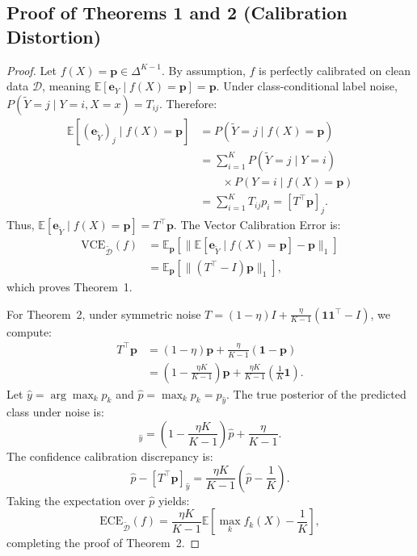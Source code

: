 \documentclass[journal]{IEEEtran}
\theoremstyle{definition}
\begin{document}
\subsection{Proof of Theorems 1 and 2 (Calibration Distortion)}
\label{sec:proof_calibration}
\begin{proof}
Let $f(X) = \mathbf{p} \in \Delta^{K-1}$. By assumption, $f$ is perfectly calibrated on clean data $\mathcal{D}$, meaning $\mathbb{E}[\mathbf{e}_Y \mid f(X) = \mathbf{p}] = \mathbf{p}$. Under class-conditional label noise, $P(\tilde{Y} = j \mid Y = i, X = x) = T_{ij}$. Therefore:
\begin{align}
\mathbb{E}[(\mathbf{e}_{\tilde{Y}})_j \mid f(X) = \mathbf{p}] &= P(\tilde{Y} = j \mid f(X) = \mathbf{p}) \nonumber \\
&= \sum_{i=1}^K P(\tilde{Y} = j \mid Y = i) \nonumber \\
&\qquad \times P(Y = i \mid f(X) = \mathbf{p}) \nonumber \\
&= \sum_{i=1}^K T_{ij} p_i = [T^\top \mathbf{p}]_j.
\end{align}
Thus, $\mathbb{E}[\mathbf{e}_{\tilde{Y}} \mid f(X) = \mathbf{p}] = T^\top \mathbf{p}$. The Vector Calibration Error is:
\begin{align}
\text{VCE}_{\tilde{\mathcal{D}}}(f) &= \mathbb{E}_{\mathbf{p}} \left[ \| \mathbb{E}[\mathbf{e}_{\tilde{Y}} \mid f(X) = \mathbf{p}] - \mathbf{p} \|_1 \right] \nonumber \\
&= \mathbb{E}_{\mathbf{p}} \left[ \| (T^\top - I) \mathbf{p} \|_1 \right],
\end{align}
which proves Theorem~1.

For Theorem~2, under symmetric noise $T = (1 - \eta) I + \frac{\eta}{K-1} (\mathbf{1}\mathbf{1}^\top - I)$, we compute:
\begin{align}
T^\top \mathbf{p} &= (1 - \eta) \mathbf{p} + \frac{\eta}{K-1} (\mathbf{1} - \mathbf{p}) \nonumber \\
&= \left( 1 - \frac{\eta K}{K-1} \right) \mathbf{p} + \frac{\eta K}{K-1} \left( \frac{1}{K} \mathbf{1} \right).
\end{align}
Let $\hat{y} = \arg\max_k p_k$ and $\hat{p} = \max_k p_k = p_{\hat{y}}$. The true posterior of the predicted class under noise is:
\begin{equation}
[T^\top \mathbf{p}]_{\hat{y}} = \left( 1 - \frac{\eta K}{K-1} \right) \hat{p} + \frac{\eta}{K-1}.
\end{equation}
The confidence calibration discrepancy is:
\begin{equation}
\hat{p} - [T^\top \mathbf{p}]_{\hat{y}} = \frac{\eta K}{K-1} \left( \hat{p} - \frac{1}{K} \right).
\end{equation}
Taking the expectation over $\hat{p}$ yields:
\begin{equation}
\text{ECE}_{\tilde{\mathcal{D}}}(f) = \frac{\eta K}{K-1} \mathbb{E} \left[ \max_k f_k(X) - \frac{1}{K} \right],
\end{equation}
completing the proof of Theorem~2.
\end{proof}
\end{document}
